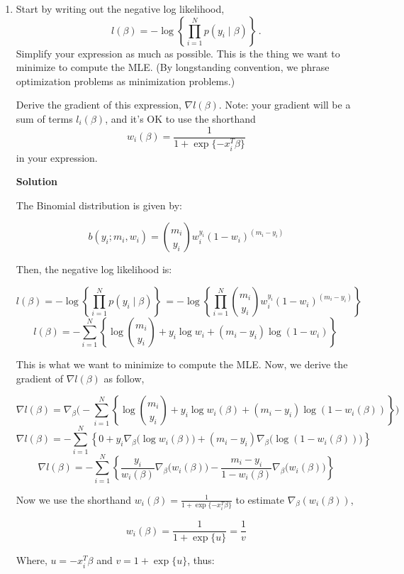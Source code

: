 \documentclass[11 pt]{article}
\begin{document}
\begin{enumerate}[label=(\Alph*)]

\item Start by writing out the negative log likelihood,
$$
l(\beta) = - \log \left \{ \prod_{i=1}^N p(y_i \mid \beta) \right \} \, .
$$
Simplify your expression as much as possible. This is the thing we want to minimize to compute the MLE.  (By longstanding convention, we phrase optimization problems as minimization problems.)

Derive the gradient of this expression, $\nabla l(\beta)$.   Note: your gradient will be a sum of terms $l_i(\beta)$, and it's OK to use the shorthand
$$
w_i(\beta) =  \frac{1}{1 + \exp\{-x_i^T \beta\}}
$$
in your expression.

\vspace{2mm}
\textbf{Solution}

The Binomial distribution is given by:

$$ b(y_i;m_i,w_i)=\binom{m_i}{y_i}w_i^{y_i}(1-w_i)^{(m_i - y_i)}$$

Then, the negative log likelihood is:

$$ l(\beta) = - \log \left \{ \prod_{i=1}^N p(y_i \mid \beta) \right \} \, =- \log \left \{ \prod_{i=1}^N \binom{m_i}{y_i}w_i^{y_i}(1-w_i)^{(m_i - y_i)} \right \} \, $$
$$  l(\beta)=- \displaystyle\sum_{i=1}^{N}\left \{ \log \binom{m_i}{y_i} + y_i\log w_i + (m_i - y_i)\log(1-w_i) \right \} \,$$

This is what we want to minimize to compute the MLE. Now, we derive the gradient of $\nabla l(\beta)$ as follow,

$$  \nabla l(\beta) =\nabla_{\beta} \bigg( - \displaystyle\sum_{i=1}^{N}\left \{ \log \binom{m_i}{y_i} + y_i\log w_i(\beta) + (m_i - y_i)\log(1-w_i(\beta)) \right \}\bigg) $$
$$  \nabla l(\beta) =  - \displaystyle\sum_{i=1}^{N}\left \{ 0 + y_i\nabla_\beta\bigg(\log w_i(\beta)\bigg) + (m_i - y_i)\nabla_\beta\bigg(\log(1-w_i(\beta))\bigg) \right \} $$
$$  \nabla l(\beta) =  - \displaystyle\sum_{i=1}^{N}\left \{ \frac{y_i}{w_i(\beta)}\nabla_\beta\bigg(w_i(\beta)\bigg) - \frac{m_i - y_i}{1-w_i(\beta)}\nabla_\beta\bigg(w_i(\beta)\bigg) \right \} $$

Now we use the shorthand $ w_i(\beta) =  \frac{1}{1 + \exp\{-x_i^T \beta\}} $ to estimate $\nabla_\beta(w_i(\beta))$,

$$w_i(\beta)=\frac{1}{1 + \exp\{u\}} = \frac{1}{v}$$

Where, $u=-x_i^T \beta$ and $v = 1+\exp\{u\} $, thus:


\end{enumerate}
\end{document}
